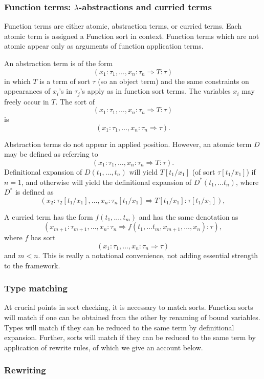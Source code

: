 \documentclass[12pt]{article}
\begin{document}
\subsubsection{Function terms:  $\lambda$-abstractions and curried terms}

Function terms are either atomic, abstraction terms, or curried terms.   Each atomic term is assigned a Function sort in context.  Function terms which are not atomic appear only as arguments of function application terms.

An abstraction term is of the form $$(x_1:\tau_1,\ldots,x_n:\tau_n\Rightarrow T:\tau)$$ in which $T$ is a term of sort $\tau$ (so an object term) and the same constraints on appearances of $x_i$'s in $\tau_j$'s apply as in function sort terms.  The variables $x_i$ may freely occur in $T$.  The sort of $$(x_1:\tau_1,\ldots,x_n:\tau_n\Rightarrow T:\tau)$$ is
$$(x_1:\tau_1,\ldots,x_n:\tau_n\Rightarrow\tau).$$

Abstraction terms do not appear in applied position.  However, an atomic term $D$ may be defined as referring to $$(x_1:\tau_1,\ldots,x_n:\tau_n\Rightarrow T:\tau).$$
Definitional expansion of $D(t_1,\ldots,t_n)$ will yield $T[t_1/x_1]$ (of sort $\tau[t_1/x_1]$) if $n=1$, and otherwise will yield the definitional expansion of $D^*(t_1,\ldots t_n)$,
where $D^*$ is defined as $$(x_2:\tau_2[t_1/x_1],\ldots,x_n:\tau_n[t_1/x_1]\Rightarrow T[t_1/x_1]:\tau[t_1/x_1]),$$

A curried term has the form $f(t_1,\ldots,t_m)$ and has the same denotation as $$(x_{m+1}:\tau_{m+1},\ldots,x_n:\tau_n\Rightarrow f(t_1,\ldots t_m,x_{m+1},\ldots,x_n):\tau),$$
where $f$ has sort  $$(x_1:\tau_1,\ldots,x_n:\tau_n\Rightarrow \tau)$$ and $m<n$.  This is really a notational convenience, not adding essential strength to the framework.

\subsubsection{Type matching}

At crucial points in sort checking, it is necessary to match sorts.  Function sorts will match if one can be obtained from the other by renaming of bound variables.   Types will match
if they can be reduced to the same term by definitional expansion.  Further, sorts will match if they can be reduced to the same term by application of rewrite rules, of which we give an account below.

\subsubsection{Rewriting}
\end{document}
